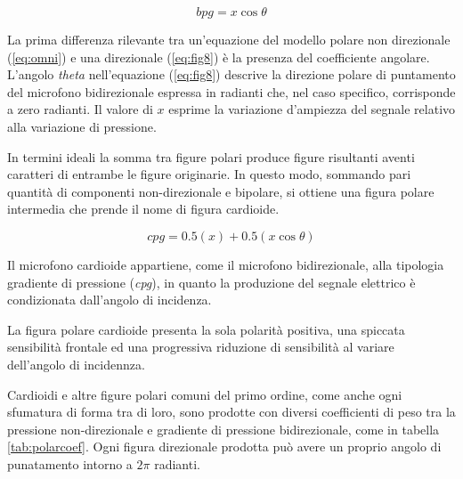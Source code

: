 \begin{refsection}
\begin{equation}
bpg = x\cos\theta
\label{eq:fig8}
\end{equation}

La prima differenza rilevante tra un'equazione del modello polare non
direzionale (\ref{eq:omni}) e una direzionale (\ref{eq:fig8}) è la
presenza del coefficiente angolare. L'angolo \emph{theta} nell'equazione
(\ref{eq:fig8}) descrive la direzione polare di puntamento del microfono bidirezionale
espressa in radianti che, nel caso specifico, corrisponde a zero radianti. Il valore di
$x$ esprime la variazione d'ampiezza del segnale relativo alla variazione di pressione.

In termini ideali la somma tra figure polari produce figure risultanti aventi caratteri
di entrambe le figure originarie. In questo modo, sommando pari quantità di componenti
non-direzionale e bipolare, si ottiene una figura polare intermedia che prende il
nome di figura cardioide.

\begin{equation}
cpg = 0.5(x) + 0.5(x\cos\theta)
\label{eq:cardioid}
\end{equation}

Il microfono cardioide appartiene, come il microfono bidirezionale, alla tipologia
gradiente di pressione (\emph{cpg}), in quanto la produzione del segnale elettrico è condizionata
dall'angolo di incidenza.

La figura polare cardioide presenta la sola polarità positiva, una spiccata
sensibilità frontale ed una progressiva riduzione di sensibilità al variare dell'angolo
di incidennza.

Cardioidi e altre figure polari comuni del primo ordine, come anche ogni
sfumatura di forma tra di loro, sono prodotte con diversi coefficienti di peso
tra la pressione non-direzionale e gradiente di pressione bidirezionale,
come in tabella \ref{tab:polarcoef}. Ogni figura direzionale prodotta può avere
un proprio angolo di punatamento intorno a $2\pi$ radianti.

\vfill\null

\clearpage


\end{refsection}
